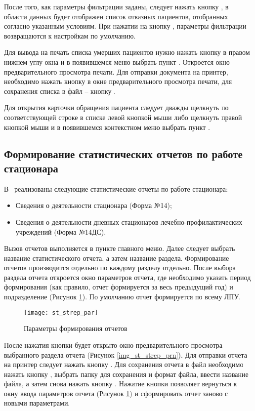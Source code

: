 После того, как параметры фильтрации заданы, следует нажать кнопку , в области данных будет отображен список отказных пациентов, отобранных согласно указанным условиям. При нажатии на кнопку , параметры фильтрации возвращаются к настройкам по умолчанию.

Для вывода на печать списка умерших пациентов нужно нажать кнопку  в правом нижнем углу окна и в появившемся меню выбрать пункт . Откроется окно предварительного просмотра печати. Для отправки документа на принтер, необходимо нажать кнопку   в окне предварительного просмотра печати, для сохранения списка в файл – кнопку .

Для открытия карточки обращения пациента следует дважды щелкнуть по соответствующей строке в списке левой кнопкой мыши либо щелкнуть правой кнопкой мыши и в появившемся контекстном меню выбрать пункт .

\subsection{Формирование статистических отчетов по работе стационара}

В \tmis~реализованы следующие статистические отчеты по работе стационара:
\begin{itemize}
 \item Сведения о деятельности стационара (Форма №14);
 \item Сведения о деятельности  дневных  стационаров  лечебно-профилакти\-чес\-ких учреждений (Форма №14ДС).
\end{itemize}

Вызов отчетов выполняется в пункте  главного меню. Далее следует выбрать название статистического отчета, а затем название раздела. Формирование отчетов производится отдельно по каждому разделу отдельно. После выбора раздела отчета откроется окно параметров отчета, где необходимо указать период формирования (как правило, отчет формируется за весь предыдущий год) и подразделение (Рисунок \ref{img_st_strep_par}). По умолчанию отчет формируется по всему ЛПУ.

\begin{figure}[ht]\centering
   \texttt{[image: st\_strep\_par]}
   \caption{Параметры формирования отчетов}
   \label{img_st_strep_par}
\end{figure}

После нажатия кнопки   будет открыто окно предварительного просмотра выбранного раздела отчета (Рисунок \ref{img_st_strep_prn}). Для отправки отчета на принтер следует нажать кнопку . Для сохранения отчета в файл необходимо нажать кнопку , выбрать папку для сохранения и формат файла, ввести название файла, а затем снова нажать кнопку . Нажатие кнопки  позволяет вернуться к окну ввода параметров отчета (Рисунок \ref{img_st_strep_par}) и сформировать отчет заново с новыми параметрами.

